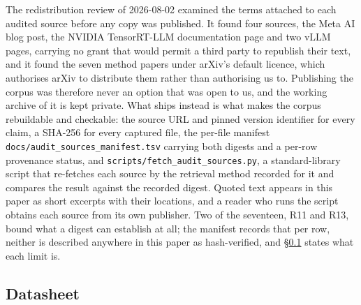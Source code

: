 The redistribution review of 2026-08-02 examined the terms attached to each
audited source before any copy was published. It found four sources, the Meta AI
blog post, the NVIDIA TensorRT-LLM documentation page and two vLLM pages,
carrying no grant that would permit a third party to republish their text, and
it found the seven method papers under arXiv's default licence, which authorises
arXiv to distribute them rather than authorising us to. Publishing the corpus was
therefore never an option that was open to us, and the working archive of it is
kept private. What ships instead is what makes the corpus rebuildable and
checkable: the source URL and pinned version identifier for every claim, a
SHA-256 for every captured file, the per-file manifest
\texttt{docs/\allowbreak{}audit\_sources\_\allowbreak{}manifest.tsv} carrying
both digests and a per-row provenance status, and
\texttt{scripts/\allowbreak{}fetch\_\allowbreak{}audit\_sources.py}, a
standard-library script that re-fetches each source by the retrieval method
recorded for it and compares the result against the recorded digest. Quoted text
appears in this paper as short excerpts with their locations, and a reader who
runs the script obtains each source from its own publisher. Two of the
seventeen, R11 and R13, bound what a digest can establish at all; the manifest
records that per row, neither is described anywhere in this paper as
hash-verified, and \S\ref{app:artifacts:datasheet} states what each limit is.

\subsection{Datasheet}
\label{app:artifacts:datasheet}

